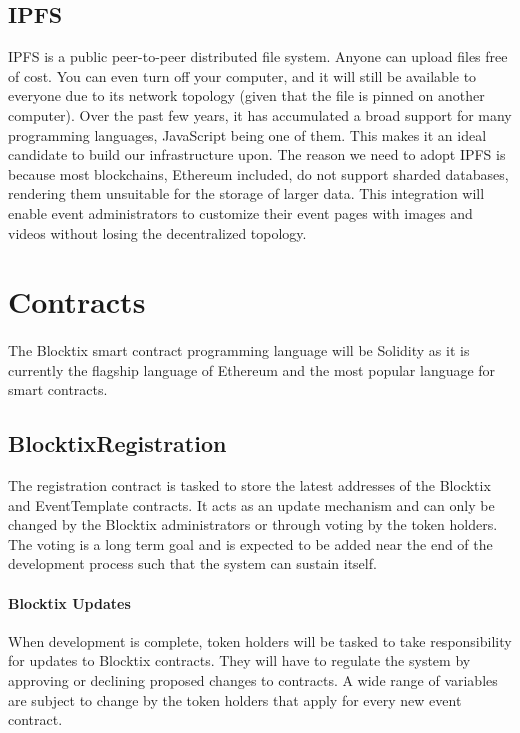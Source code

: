 \documentclass[a4paper]{article}
\begin{document}
\subsection{IPFS}
IPFS is a public peer-to-peer distributed file system. Anyone can upload files free of cost. You can even turn off your computer, and it will still be available to everyone due to its network topology (given that the file is pinned on another computer). Over the past few years, it has accumulated a broad support for many programming languages, JavaScript being one of them. This makes it an ideal candidate to build our infrastructure upon.
The reason we need to adopt IPFS is because most blockchains, Ethereum included, do not support sharded databases, rendering them unsuitable for the storage of larger data. This integration will enable event administrators to customize their event pages with images and videos without losing the decentralized topology.




\section{Contracts}

\paragraph{}
The Blocktix smart contract programming language will be Solidity\cite{crgwSolidity} as it is currently the flagship language of Ethereum and the most popular language for smart contracts.

\subsection{BlocktixRegistration}
The registration contract is tasked to store the latest addresses of the Blocktix and EventTemplate contracts. It acts as an update mechanism and can only be changed by the Blocktix administrators or through voting by the token holders. The voting is a long term goal and is expected to be added near the end of the development process such that the system can sustain itself.



\paragraph{Blocktix Updates}
When development is complete, token holders will be tasked to take responsibility for updates to Blocktix contracts. They will have to regulate the system by approving or declining proposed changes to contracts. A wide range of variables are subject to change by the token holders that apply for every new event contract. 
\end{document}
